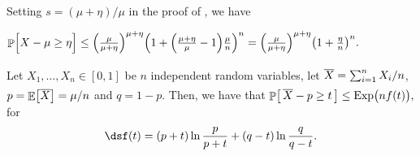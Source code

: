 \begin{remark}
    Setting $s = (\mu + \eta)/\mu$ in the proof of 
    , we have
    
    \medskip%
    \centerline{%
    \begin{math}
        \Prob{\Bigl.X - \mu \geq \eta }%
        \leq %
        \pth{\frac{\mu}{\mu + \eta}}^{\mu + \eta}%
        \pth{1 + \pth{\frac{\mu + \eta}{\mu}-1} \frac{\mu}{n}}^n%
        = %
        \pth{\frac{\mu}{\mu + \eta}}^{\mu + \eta} \pth{1 +
           \frac{\eta}{n}}^n.%
    \end{math}%
 }
\end{remark}


\begin{corollary}
    Let $X_1, \ldots, X_n \in [0,1]$ be $n$ independent random
    variables, let $\Bigl.\overline{X} = \sum_{i=1}^n X_i/n$,
    $p = \mathop{\mathbb{E}}\!\left[ {\overline{X}} \right] = \mu/n$ and $q = 1-p$. Then, we have that
    \begin{math}
        \ds%
        \Prob{\bigl.\, \overline{X} - p \geq t \, }%
        \leq%
        \Exp\pth{ \bigl. nf(t)},
    \end{math}
    for
    \begin{align}
        \eqlab{f:t:cher}%
        \ds%
        f(t) = (p+t)\ln \frac{p}{p+t} + (q-t)\ln \frac{q}{q-t}.
    \end{align}%
\end{corollary}

